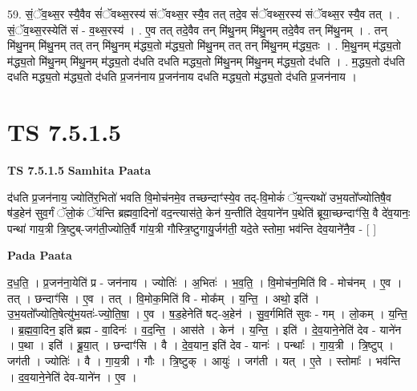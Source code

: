 \documentclass[17pt]{extarticle}
\begin{document}
59. सं॒ॅव॒थ्स॒र स्यै॒वैव सं॑ॅवथ्स॒रस्य॑ संॅवथ्स॒र स्यै॒व तत् तदे॒व सं॑ॅवथ्स॒रस्य॑ संॅवथ्स॒र स्यै॒व तत् । . सं॒ॅव॒थ्स॒रस्येति॑ सं - व॒थ्स॒रस्य॑ । . ए॒व तत् तदे॒वैव तन् मि॑थु॒नम् मि॑थु॒नम् तदे॒वैव तन् मि॑थु॒नम् । . तन् मि॑थु॒नम् मि॑थु॒नम् तत् तन् मि॑थु॒नम् म॑द्ध्य॒तो म॑द्ध्य॒तो मि॑थु॒नम् तत् तन् मि॑थु॒नम् म॑द्ध्य॒तः । . मि॒थु॒नम् म॑द्ध्य॒तो म॑द्ध्य॒तो मि॑थु॒नम् मि॑थु॒नम् म॑द्ध्य॒तो द॑धति दधति मद्ध्य॒तो मि॑थु॒नम् मि॑थु॒नम् म॑द्ध्य॒तो द॑धति । . म॒द्ध्य॒तो द॑धति दधति मद्ध्य॒तो म॑द्ध्य॒तो द॑धति प्र॒जन॑नाय प्र॒जन॑नाय दधति मद्ध्य॒तो म॑द्ध्य॒तो द॑धति प्र॒जन॑नाय । \newline
\pagebreak
{}

\section{ TS 7.5.1.5 }

\textbf{TS 7.5.1.5 } \newline
\textbf{Samhita Paata} \newline

द॑धति प्र॒जन॑नाय॒ ज्योति॑र॒भितो॑ भवति वि॒मोच॑नमे॒व तच्छन्दाꣳ॑स्ये॒व तद्-वि॒मोकं॑ ॅय॒न्त्यथो॑ उभ॒यतो᳚ज्योतिषै॒व ष॑ड॒हेन॑ सुव॒र्गं ॅलो॒कं ॅय॑न्ति ब्रह्मवा॒दिनो॑ वद॒न्त्यास॑ते॒ केन॑ य॒न्तीति॑ देव॒याने॑न प॒थेति॑ ब्रूया॒च्छन्दाꣳ॑सि॒ वै दे॑व॒यानः॒ पन्था॑ गाय॒त्री त्रि॒ष्टुब्-जग॑ती॒ज्योति॒र्वै गा॑य॒त्री गौस्त्रि॒ष्टुगायु॒र्जग॑ती॒ यदे॒ते स्तोमा॒ भव॑न्ति देव॒याने॑नै॒व - [  ] \newline

\textbf{Pada Paata} \newline

द॒ध॒ति॒ । प्र॒जन॑ना॒येति॑ प्र - जन॑नाय । ज्योतिः॑ । अ॒भितः॑ । भ॒व॒ति॒ । वि॒मोच॑न॒मिति॑ वि - मोच॑नम् । ए॒व । तत् । छन्दाꣳ॑सि । ए॒व । तत् । वि॒मोक॒मिति॑ वि - मोक᳚म् । य॒न्ति॒ । अथो॒ इति॑ । उ॒भ॒यतो᳚ज्योति॒षेत्यु॑भ॒यतः॑-ज्यो॒ति॒षा॒ । ए॒व । ष॒ड॒हेनेति॑ षट्-अ॒हेन॑ । सु॒व॒र्गमिति॑ सुवः - गम् । लो॒कम् । य॒न्ति॒ । ब्र॒ह्म॒वा॒दिन॒ इति॑ ब्रह्म - वा॒दिनः॑ । व॒द॒न्ति॒ । आस॑ते । केन॑ । य॒न्ति॒ । इति॑ । दे॒व॒याने॒नेति॑ देव - याने॑न । प॒था । इति॑ । ब्रू॒या॒त् । छन्दाꣳ॑सि । वै । दे॒व॒यान॒ इति॑ देव - यानः॑ । पन्थाः᳚ । गा॒य॒त्री । त्रि॒ष्टुप् । जग॑ती । ज्योतिः॑ । वै । गा॒य॒त्री । गौः । त्रि॒ष्टुक् । आयुः॑ । जग॑ती । यत् । ए॒ते । स्तोमाः᳚ । भव॑न्ति । द॒व॒याने॒नेति॑ देव-याने॑न । ए॒व ।  \newline
\end{document}

